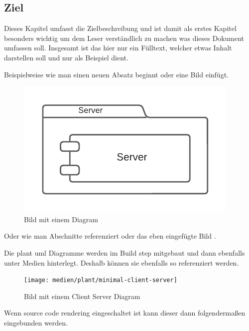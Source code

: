 \subsection{Ziel} \label{sec:goal}

Dieses Kapitel umfasst die Zielbeschreibung und ist damit als erstes Kapitel besonders wichtig um dem Leser verständlich zu machen was dieses Dokument umfassen soll.
Insgesamt ist das hier nur ein Fülltext, welcher etwas Inhalt darstellen soll und nur als Beispiel dient.

Beispielweise wie man einen neuen Absatz beginnt oder eine Bild einfügt.

\begin{figure}[htb]
    \centering
    \includegraphics[scale=.65,center]{medien/diagrams/server}
    \caption{Bild mit einem Diagram}
    \ownsource
    \label{fig:server-diagram}
\end{figure}


Oder wie man Abschnitte referenziert  oder das eben eingefügte Bild .

Die plant uml Diagramme werden im Build step mitgebaut und dann ebenfalls unter Medien hinterlegt.
Deshalb können sie ebenfalls so referenziert werden.

\begin{figure}[htb]
    \centering
    \texttt{[image: medien/plant/minimal-client-server]}
    \caption{Bild mit einem Client Server Diagram}
    \ownsource
    \label{fig:minimal-client-server-diagram}
\end{figure}

\FloatBarrier

Wenn source code rendering eingeschaltet ist kann dieser dann folgendermaßen eingebunden werden.

